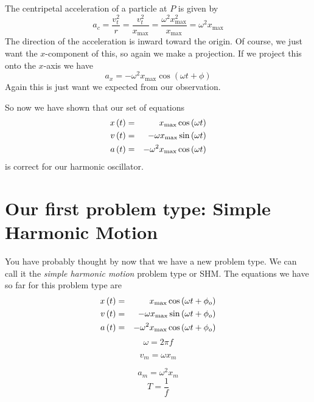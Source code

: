 \documentclass{book}
\begin{document}
The centripetal acceleration of a particle at $P$ is given by 
\begin{equation}
a_{c}=\frac{v_{t}^{2}}{r}=\frac{v_{t}^{2}}{x_{\max }}=\frac{\omega
^{2}x_{\max }^{2}}{x_{\max }}=\omega ^{2}x_{\max }
\end{equation}%
The direction of the acceleration is inward toward the origin. Of course, we
just want the $x$-component of this, so again we make a projection. If we
project this onto the $x$-axis we have%
\begin{equation}
a_{x}=-\omega ^{2}x_{\max }\cos \left( \omega t+\phi \right)
\end{equation}%
Again this is just want we expected from our observation.

So now we have shown that our set of equations 
\begin{eqnarray}
x\left( t\right) &=&x_{\max }\cos \left( \omega t\right) \\
v\left( t\right) &=&-\omega x_{\max }\sin \left( \omega t\right)  \notag \\
a\left( t\right) &=&-\omega ^{2}x_{\max }\cos \left( \omega t\right)  \notag
\end{eqnarray}%
is correct for our harmonic oscillator.

\section{Our first problem type: Simple Harmonic Motion}

You have probably thought by now that we have a new problem type. We can
call it the \emph{simple harmonic motion }problem type or SHM. The equations
we have so far for this problem type are 
\begin{eqnarray}
x\left( t\right) &=&x_{\max }\cos \left( \omega t+\phi _{o}\right) \\
v\left( t\right) &=&-\omega x_{\max }\sin \left( \omega t+\phi _{o}\right) 
\notag \\
a\left( t\right) &=&-\omega ^{2}x_{\max }\cos \left( \omega t+\phi
_{o}\right)  \notag
\end{eqnarray}%
\begin{equation*}
\omega =2\pi f
\end{equation*}

\begin{equation*}
v_{m}=\omega x_{m}
\end{equation*}

\begin{equation*}
a_{m}=\omega ^{2}x_{m}
\end{equation*}%
\begin{equation*}
T=\frac{1}{f}
\end{equation*}
\end{document}
